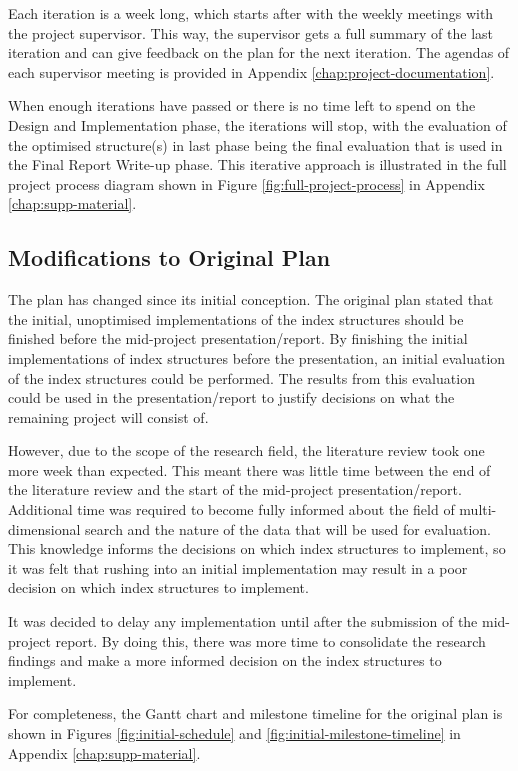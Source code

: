 Each iteration is a week long, which starts after with the weekly meetings with the project supervisor. This way, the supervisor gets a full summary of the last iteration and can give feedback on the plan for the next iteration. The agendas of each supervisor meeting is provided in Appendix \ref{chap:project-documentation}.

When enough iterations have passed or there is no time left to spend on the Design and Implementation phase, the iterations will stop, with the evaluation of the optimised structure(s) in last phase being the final evaluation that is used in the Final Report Write-up phase. This iterative approach is illustrated in the full project process diagram shown in Figure \ref{fig:full-project-process} in Appendix \ref{chap:supp-material}.

\subsection{Modifications to Original Plan}

The plan has changed since its initial conception. The original plan stated that the initial, unoptimised implementations of the index structures should be finished before the mid-project presentation/report. By finishing the initial implementations of index structures before the presentation, an initial evaluation of the index structures could be performed. The results from this evaluation could be used in the presentation/report to justify decisions on what the remaining project will consist of.

However, due to the scope of the research field, the literature review took one more week than expected. This meant there was little time between the end of the literature review and the start of the mid-project presentation/report. Additional time was required to become fully informed about the field of multi-dimensional search and the nature of the data that will be used for evaluation. This knowledge informs the decisions on which index structures to implement, so it was felt that rushing into an initial implementation may result in a poor decision on which index structures to implement.

It was decided to delay any implementation until after the submission of the mid-project report. By doing this, there was more time to consolidate the research findings and make a more informed decision on the index structures to implement.

For completeness, the Gantt chart and milestone timeline for the original plan is shown in Figures \ref{fig:initial-schedule} and \ref{fig:initial-milestone-timeline} in Appendix \ref{chap:supp-material}.

